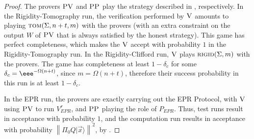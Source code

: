 \documentclass{toc}
\newcommand{\ket}[1]{|#1\rangle}
\newcommand{\norm}[1]{\left\|#1\right\|}
\newcommand{\rigid}{\textsc{rigid}}
\newcommand{\tom}{\textsc{tom}}
\newcommand{\ver}{\textsc{V}}
\newcommand{\pv}{\textsc{PV}}
\newcommand{\pp}{\textsc{PP}}
\begin{document}
\begin{proof}
The provers $\pv$ and $\pp$ play the strategy described in
,
%
  respectively. In the Rigidity-Tomography run, the verification performed by
  $\ver$ amounts to playing $\tom(\Sigma,n+t,m)$ with the provers (with an extra
  constraint on the output $W$ of $\pv$ that is always satisfied by the honest
  strategy). This game has perfect
  completeness, which makes the $\ver$
  accept with probability $1$ in the Rigidity-Tomography run.
  In the Rigidity-Clifford run, $\ver$ plays $\rigid(\Sigma,m)$
  with the provers. The game
  has completeness at least $1-\delta_c$ for some $\delta_c=\eee^{-\Omega(n+t)}$,
  since $m=\Omega(n+t)$, therefore their success probability in this run is
  at least $1-\delta_c$.

In the EPR run, the provers are exactly carrying out the EPR Protocol, with $\ver$ using $\pv$ to run $V_{EPR}^r$, and $\pp$ playing the role of $P_{EPR}$. Thus, test runs result in acceptance with probability $1$, and the computation run results in acceptance with probability $\norm{\Pi_0 Q\ket{\vec{x}}}^2$, by . 
\end{proof}

%
\newpage   %
\end{document}

